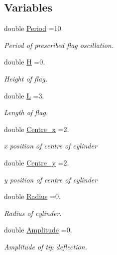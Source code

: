 \subsection*{Variables}
\begin{DoxyCompactItemize}
\item 
double \hyperlink{namespaceFlag__definition_a47976a19abd58b9c31671f074ca57285}{Period} =10.
\begin{DoxyCompactList}\small\item\em Period of prescribed flag oscillation. \end{DoxyCompactList}\item 
double \hyperlink{namespaceFlag__definition_a6cdf33de1fe6f94832181664d7769af7}{H} =0.
\begin{DoxyCompactList}\small\item\em Height of flag. \end{DoxyCompactList}\item 
double \hyperlink{namespaceFlag__definition_a94553533bee82260731a466182369a9d}{L} =3.
\begin{DoxyCompactList}\small\item\em Length of flag. \end{DoxyCompactList}\item 
double \hyperlink{namespaceFlag__definition_a60f30c718c6c67504b05dca7832be8aa}{Centre\+\_\+x} =2.
\begin{DoxyCompactList}\small\item\em x position of centre of cylinder \end{DoxyCompactList}\item 
double \hyperlink{namespaceFlag__definition_a0024007edc2ad0ef647939aa6b06bde7}{Centre\+\_\+y} =2.
\begin{DoxyCompactList}\small\item\em y position of centre of cylinder \end{DoxyCompactList}\item 
double \hyperlink{namespaceFlag__definition_a921d8bd82b7b267651dea625a548dfcb}{Radius} =0.
\begin{DoxyCompactList}\small\item\em Radius of cylinder. \end{DoxyCompactList}\item 
double \hyperlink{namespaceFlag__definition_ad0eb269ec983b485aa24a6f2c25d2f5b}{Amplitude} =0.
\begin{DoxyCompactList}\small\item\em Amplitude of tip deflection. \end{DoxyCompactList}\item 

\end{DoxyCompactItemize}

